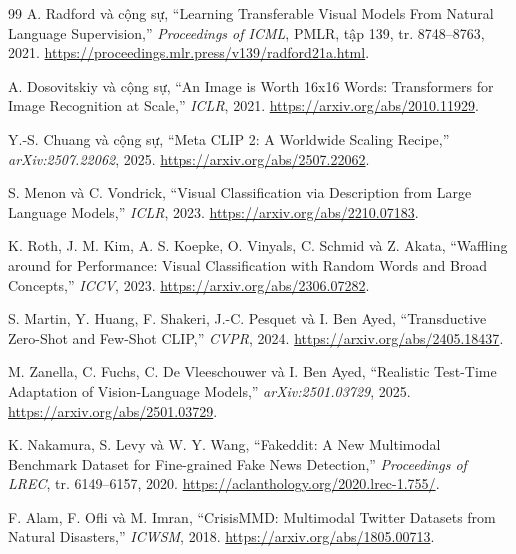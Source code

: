 \documentclass[12pt,a4paper]{article}
\newcommand{\BodySize}{13}
\newcommand{\BodyLeading}{15.6}
\newcommand{\BodyFont}{\fontsize{\BodySize}{\BodyLeading}\selectfont}
\numberwithin{figure}{section}
\numberwithin{table}{section}
\numberwithin{equation}{section}
\newcommand{\frontsection}[1]{\FrontHeading{#1}}
\begin{document}
\clearpage
\frontsection{TÀI LIỆU THAM KHẢO}
\begingroup
\BodyFont
\renewcommand{\section}[2]{}
\begin{thebibliography}{99}
A. Radford và cộng sự, ``Learning Transferable Visual Models From Natural Language Supervision,'' \textit{Proceedings of ICML}, PMLR, tập 139, tr. 8748--8763, 2021.
\url{https://proceedings.mlr.press/v139/radford21a.html}.

A. Dosovitskiy và cộng sự, ``An Image is Worth 16x16 Words: Transformers for Image Recognition at Scale,'' \textit{ICLR}, 2021.
\url{https://arxiv.org/abs/2010.11929}.

Y.-S. Chuang và cộng sự, ``Meta CLIP 2: A Worldwide Scaling Recipe,'' \textit{arXiv:2507.22062}, 2025.
\url{https://arxiv.org/abs/2507.22062}.

S. Menon và C. Vondrick, ``Visual Classification via Description from Large Language Models,'' \textit{ICLR}, 2023.
\url{https://arxiv.org/abs/2210.07183}.

K. Roth, J. M. Kim, A. S. Koepke, O. Vinyals, C. Schmid và Z. Akata, ``Waffling around for Performance: Visual Classification with Random Words and Broad Concepts,'' \textit{ICCV}, 2023.
\url{https://arxiv.org/abs/2306.07282}.

S. Martin, Y. Huang, F. Shakeri, J.-C. Pesquet và I. Ben Ayed, ``Transductive Zero-Shot and Few-Shot CLIP,'' \textit{CVPR}, 2024.
\url{https://arxiv.org/abs/2405.18437}.

M. Zanella, C. Fuchs, C. De Vleeschouwer và I. Ben Ayed, ``Realistic Test-Time Adaptation of Vision-Language Models,'' \textit{arXiv:2501.03729}, 2025.
\url{https://arxiv.org/abs/2501.03729}.

K. Nakamura, S. Levy và W. Y. Wang, ``Fakeddit: A New Multimodal Benchmark Dataset for Fine-grained Fake News Detection,'' \textit{Proceedings of LREC}, tr. 6149--6157, 2020.
\url{https://aclanthology.org/2020.lrec-1.755/}.

F. Alam, F. Ofli và M. Imran, ``CrisisMMD: Multimodal Twitter Datasets from Natural Disasters,'' \textit{ICWSM}, 2018.
\url{https://arxiv.org/abs/1805.00713}.


\end{thebibliography}
\end{document}
